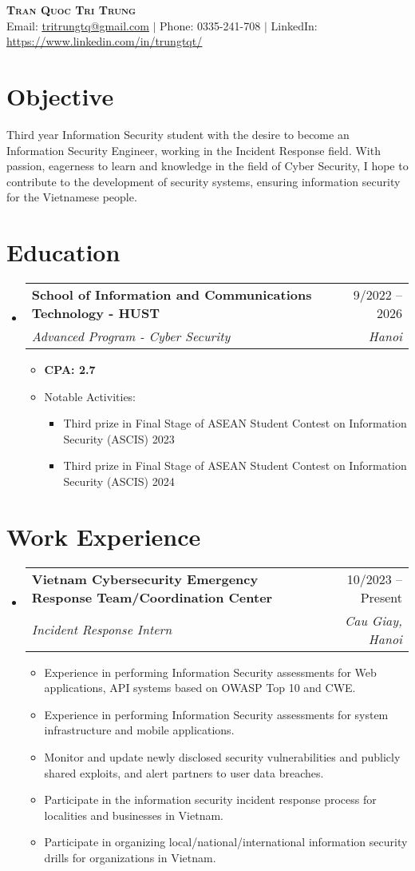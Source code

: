 \documentclass[letterpaper,10pt]{article}
\makeatletter
\newcommand{\link}[2]{\href{#1}{\color{blue}\underline{#2}}}
\newcommand{\resumeItem}[1]{
  \item\small{
    {#1 \vspace{-2pt}}
  }
}
\newcommand{\resumeSubheading}[4]{
  \vspace{-2pt}\item
  \begin{tabular*}{0.97\textwidth}[t]{l@{\extracolsep{\fill}}r}
    \textbf{#1} & #2 \\
    \textit{\small#3} & \textit{\small #4} \\
  \end{tabular*}\vspace{-7pt}
}
\newcommand{\resumeSubHeadingListStart}{\begin{itemize}[leftmargin=0.15in, label={}]}
\newcommand{\resumeSubHeadingListEnd}{\end{itemize}}
\newcommand{\resumeItemListStart}{\begin{itemize}}
\newcommand{\resumeItemSubListStart}{\begin{itemize}\setlength\itemsep{0.4em}}
\newcommand{\resumeItemListEnd}{\end{itemize}\vspace{-5pt}}
\newcommand{\resumeItemSubListEnd}{\end{itemize}}
\makeatother
\begin{document}
\begin{center}
	\textbf{\huge \scshape Tran Quoc Tri Trung} \\ \vspace{3pt}
	\small Email: \link{mailto:tritrungtq@gmail.com}{tritrungtq@gmail.com} $|$
	Phone: 0335-241-708 $|$
	LinkedIn: \link{https://www.linkedin.com/in/trungtqt/}{https://www.linkedin.com/in/trungtqt/}

\end{center}

\section{Objective}
Third year Information Security student with the desire to become an Information Security Engineer, working in the Incident Response field. With passion, eagerness to learn and knowledge in the field of Cyber Security, I hope to contribute to the development of security systems, ensuring information security for the Vietnamese people.

\section{Education}
\resumeSubHeadingListStart
\resumeSubheading
{School of Information and Communications Technology - HUST}{9/2022 -- 2026}
{Advanced Program - Cyber Security}{Hanoi}

\resumeItemListStart
\resumeItem{\textbf{CPA: 2.7}}

\resumeItem{Notable Activities:}

\resumeItemSubListStart
\resumeItem{Third prize in Final Stage of ASEAN Student Contest on Information Security (ASCIS) 2023 }
\resumeItem{Third prize in Final Stage of ASEAN Student Contest on Information Security (ASCIS) 2024 }
\resumeItemSubListEnd
\resumeItemListEnd \resumeSubHeadingListEnd

\section{Work Experience} \resumeSubHeadingListStart

\resumeSubheading {Vietnam Cybersecurity Emergency Response Team/Coordination Center}{10/2023 -- Present}
{Incident Response Intern}{Cau Giay, Hanoi}
\vspace{0.5pt}
\resumeItemListStart
\resumeItem{Experience in performing Information Security assessments for Web applications, API systems based on OWASP Top 10 and CWE.}
\resumeItem{Experience in performing Information Security assessments for system infrastructure and mobile applications.}
\resumeItem{Monitor and update newly disclosed security vulnerabilities and publicly shared exploits, and alert partners to user data breaches.}
\resumeItem{Participate in the information security incident response process for localities and businesses in Vietnam.}
\resumeItem{Participate in organizing local/national/international information security drills for organizations in Vietnam.}
\resumeItemListEnd
\resumeSubHeadingListEnd
\end{document}
